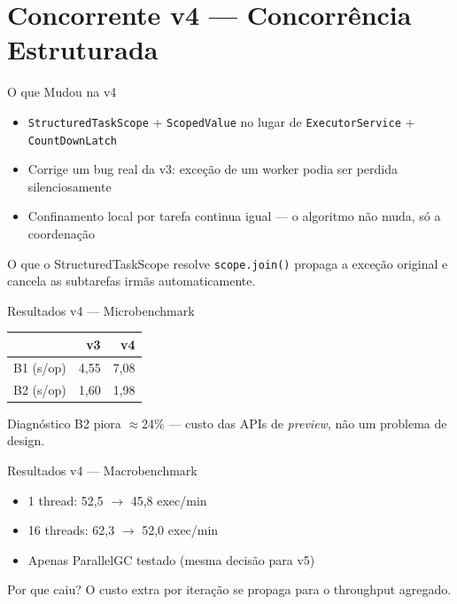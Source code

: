 \section{Concorrente v4 --- Concorrência Estruturada}

\begin{frame}{O que Mudou na v4}
    \begin{itemize}
        \item \texttt{StructuredTaskScope} + \texttt{ScopedValue} no lugar de
              \texttt{ExecutorService} + \texttt{CountDownLatch}
        \item Corrige um bug real da v3: exceção de um worker podia ser
              perdida silenciosamente
        \item Confinamento local por tarefa continua igual --- o algoritmo
              não muda, só a coordenação
    \end{itemize}

    \vspace{0.8em}
    \begin{block}{O que o StructuredTaskScope resolve}
        \texttt{scope.join()} propaga a exceção original e cancela as
        subtarefas irmãs automaticamente.
    \end{block}
\end{frame}

\begin{frame}{Resultados v4 --- Microbenchmark}
    \begin{center}
    \begin{tabular}{lrr}
        \toprule
        & \textbf{v3} & \textbf{v4} \\
        \midrule
        B1 (s/op) & 4,55 & 7,08 \\
        B2 (s/op) & 1,60 & \alert{1,98} \\
        \bottomrule
    \end{tabular}
    \end{center}

    \vspace{0.8em}
    \begin{alertblock}{Diagnóstico}
        B2 piora $\approx$\alert{24\%} --- custo das APIs de \textit{preview},
        não um problema de design.
    \end{alertblock}
\end{frame}

\begin{frame}{Resultados v4 --- Macrobenchmark}
    \begin{itemize}
        \item 1 thread: 52,5 $\to$ \alert{45,8 exec/min}
        \item 16 threads: 62,3 $\to$ \alert{52,0 exec/min}
        \item Apenas ParallelGC testado (mesma decisão para v5)
    \end{itemize}

    \vspace{0.8em}
    \begin{block}{Por que caiu?}
        O custo extra por iteração se propaga para o throughput agregado.
    \end{block}
\end{frame}

